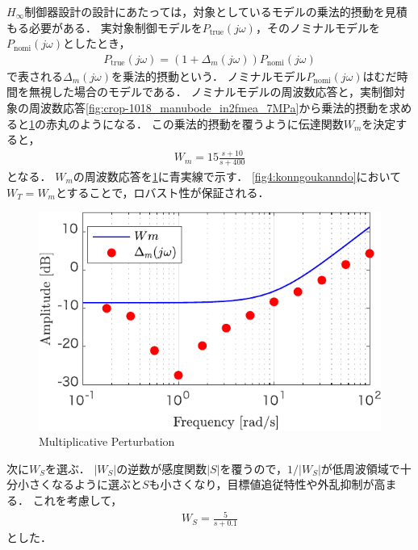 $H_\infty$制御器設計の設計にあたっては，対象としているモデルの乗法的摂動を見積もる必要がある．
実対象制御モデルを$P_\mathrm{true}(j\omega)$，そのノミナルモデルを$P_\mathrm{nomi}(j\omega)$としたとき，
\begin{align}
    P_\mathrm{true}(j\omega)= (1+\Delta_m(j\omega))P_\mathrm{nomi}(j\omega)
\end{align}
で表される$\Delta_m(j\omega)$を乗法的摂動という．
ノミナルモデル$P_\mathrm{nomi}(j\omega)$はむだ時間を無視した場合のモデルである．
ノミナルモデルの周波数応答と，実制御対象の周波数応答\figname\ref{fig:crop-1018_manubode_in2fmea_7MPa}から乗法的摂動を求めると\figname\ref{fig:Wmanddeltam-crop}の赤丸のようになる．
この乗法的摂動を覆うように伝達関数$W_m$を決定すると，
\begin{align}
    W_m = 15\frac{s+10}{s+400}
\end{align}
となる．
$W_m$の周波数応答を\figname\ref{fig:Wmanddeltam-crop}に青実線で示す．
\figname\ref{fig4:konngoukanndo}において$W_T=W_m$とすることで，ロバスト性が保証される\cite{平田201703}．

\begin{figure}[t]
    \centering
        \includegraphics[keepaspectratio, scale=1.0]{contents/Appendix_Hinfty/figure/Wmanddeltam-crop.pdf}
        \caption{Multiplicative Perturbation}
        \label{fig:Wmanddeltam-crop}
\end{figure}

次に$W_S$を選ぶ．
$|W_S|$の逆数が感度関数$|S|$を覆うので，$1/|W_S|$が低周波領域で十分小さくなるように選ぶと$S$も小さくなり，目標値追従特性や外乱抑制が高まる．
これを考慮して，
\begin{align}
    W_S = \frac{5}{s+0.1}
\end{align}
とした．

